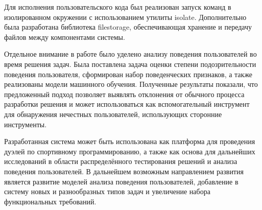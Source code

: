 Для исполнения пользовательского кода был реализован запуск команд в изолированном окружении с использованием утилиты isolate.
Дополнительно была разработана библиотека filestorage, обеспечивающая хранение и передачу файлов между компонентами системы.

Отдельное внимание в работе было уделено анализу поведения пользователей во время решения задач.
Была поставлена задача оценки степени подозрительности поведения пользователя, сформирован набор поведенческих признаков,
а также реализованы модели машинного обучения.
Полученные результаты показали, что предложенный подход позволяет выявлять отклонения от обычного процесса разработки решения
и может использоваться как вспомогательный инструмент для обнаружения нечестных пользователей, использующих сторонние инструменты.

Разработанная система может быть использована как платформа для проведения дуэлей по спортивному программированию,
а также как основа для дальнейших исследований в области распределённого тестирования решений и анализа поведения пользователей.
В дальнейшем возможным направлением развития является развитие моделей анализа поведения пользователей,
добавление в систему новых и разнообразных типов задач и увеличение набора функциональных требований.
